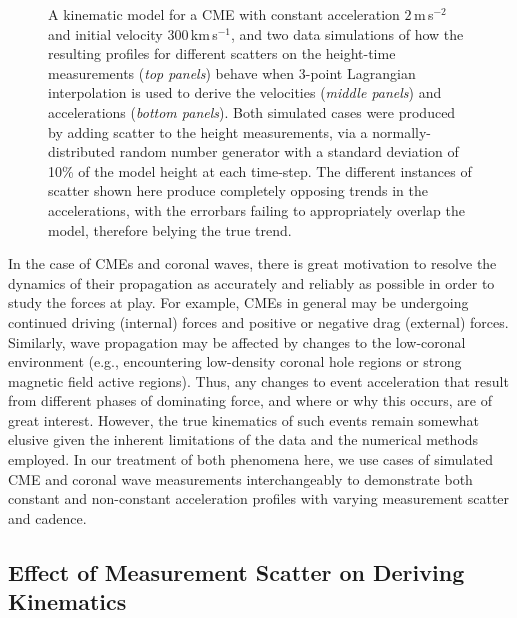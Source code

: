 \documentclass[referee]{aa}
\begin{document}
\begin{figure}[!t]
\caption{A kinematic model for a CME with constant acceleration $2$\,m\,s$^{-2}$ and initial velocity $300$\,km\,s$^{-1}$, and two data simulations of how the resulting profiles for different scatters on the height-time measurements (\emph{top panels}) behave when 3-point Lagrangian interpolation is used to derive the velocities (\emph{middle panels}) and accelerations (\emph{bottom panels}). Both simulated cases were produced by adding scatter to the height measurements, via a normally-distributed random number generator with a standard deviation of 10\% of the model height at each time-step. The different instances of scatter shown here produce completely opposing trends in the accelerations, with the errorbars failing to appropriately overlap the model, therefore belying the true trend.}
\label{sim_vels_thesis}
\end{figure}


In the case of CMEs and coronal waves, there is great motivation to resolve the dynamics of their propagation as accurately and reliably as possible in order to study the forces at play. For example, CMEs in general may be undergoing continued driving (internal) forces and positive or negative drag (external) forces. Similarly, wave propagation may be affected by changes to the low-coronal environment (e.g., encountering low-density coronal hole regions or strong magnetic field active regions). Thus, any changes to event acceleration that result from different phases of dominating force, and where or why this occurs, are of great interest. However, the true kinematics of such events remain somewhat elusive given the inherent limitations of the data and the numerical methods employed. In our treatment of both phenomena here, we use cases of simulated CME and coronal wave measurements interchangeably to demonstrate both constant and non-constant acceleration profiles with varying measurement scatter and cadence.


\subsection{Effect of Measurement Scatter on Deriving Kinematics}
\label{subsect:noise}
\end{document}
